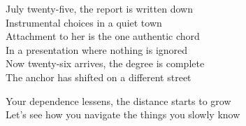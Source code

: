 \begin{lyrics}
July twenty-five, the report is written down\\
Instrumental choices in a quiet town\\
Attachment to her is the one authentic chord\\
In a presentation where nothing is ignored\\
Now twenty-six arrives, the degree is complete\\
The anchor has shifted on a different street


Your dependence lessens, the distance starts to grow\\
Let's see how you navigate the things you slowly know
\end{lyrics}

